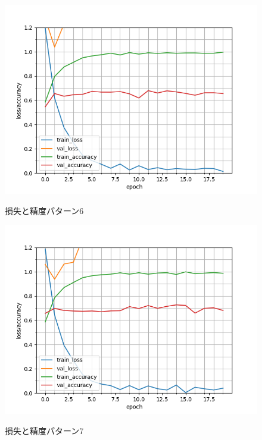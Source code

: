 \begin{figure}
	\begin{center}
		\includegraphics[scale=0.8]{./images/classify-model/loss_acuuracy_CNN_mel_6.png}
		\caption{損失と精度パターン6}
		\label{fig:CNNmel6}
		\includegraphics[scale=0.8]{./images/classify-model/loss_acuuracy_CNN_mel_7.png}
		\caption{損失と精度パターン7}
		\label{fig:CNNmel7}
	\end{center}
\end{figure}
